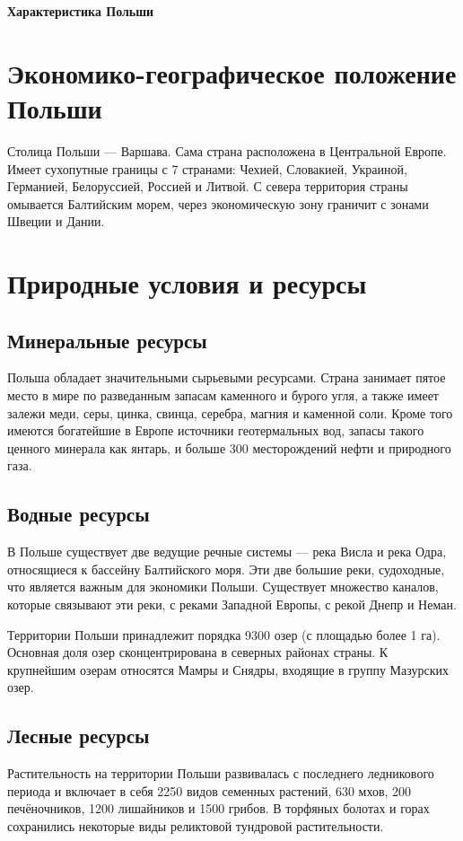 \documentclass[12pt]{article}
\begin{document}
\textbf{\LARGE Характеристика Польши}

\section{Экономико-географическое положение Польши}
Столица Польши --- Варшава. Сама страна расположена в Центральной Европе.
Имеет сухопутные границы с 7 странами: Чехией, Словакией, Украиной, Германией, Белоруссией, Россией и Литвой.
С севера территория страны омывается Балтийским морем, через экономическую зону граничит с зонами Швеции и Дании.

\section{Природные условия и ресурсы}
\subsection{Минеральные ресурсы}
Польша обладает значительными сырьевыми ресурсами.
Страна занимает пятое место в мире по разведанным запасам каменного и бурого угля, а также имеет залежи меди, серы, цинка, свинца, серебра, магния и каменной соли.
Кроме того имеются богатейшие в Европе источники геотермальных вод, запасы такого ценного минерала как янтарь, и больше 300 месторождений нефти и природного газа.

\subsection{Водные ресурсы}
В Польше существует две ведущие речные системы --- река Висла и река Одра, относящиеся к бассейну Балтийского моря.
Эти две большие реки, судоходные, что является важным для экономики Польши.
Существует множество каналов, которые связывают эти реки, с реками Западной Европы, с рекой Днепр и Неман.

Территории Польши принадлежит порядка 9300 озер (с площадью более 1 га).
Основная доля озер сконцентрирована в северных районах страны.
К крупнейшим озерам относятся Мамры и Снядры, входящие в группу Мазурских озер.

\subsection{Лесные ресурсы}
Растительность на территории Польши развивалась с последнего ледникового периода и включает в себя 2250 видов семенных растений, 630 мхов, 200 печёночников, 1200 лишайников и 1500 грибов.
В торфяных болотах и горах сохранились некоторые виды реликтовой тундровой растительности.
\end{document}
